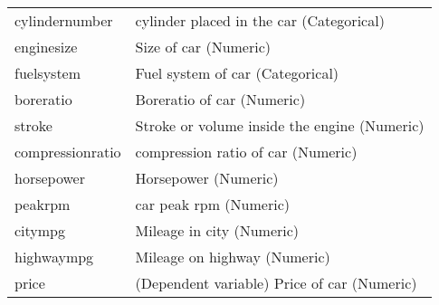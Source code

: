 \documentclass[12pt]{article}
\theoremstyle{remark}
\begin{document}
\begin{table}
\begin{tabular}{l|l}
cylindernumber	&		cylinder placed in the car (Categorical)		\\
enginesize		&	Size of car (Numeric)		\\
fuelsystem		&	Fuel system of car (Categorical)		\\
boreratio		&	Boreratio of car (Numeric)		\\
stroke	&		Stroke or volume inside the engine (Numeric)		\\
compressionratio		&	compression ratio of car (Numeric)		\\
horsepower	&		Horsepower (Numeric)		\\
peakrpm		&	car peak rpm (Numeric)		\\
citympg		&	Mileage in city (Numeric)		\\
highwaympg	&		Mileage on highway (Numeric)		\\
price	&	(Dependent variable)	Price of car (Numeric)		\\
	\hline
	\end{tabular}
\end{table}



\newpage
\end{document}
